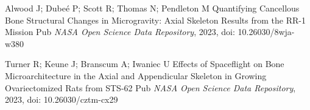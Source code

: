 \documentclass{article}
\begin{document}
\begin{thebibliography}{1}
\bibitem{}
Alwood J; Dubeé P; Scott R; Thomas N; Pendleton M
\newblock Quantifying Cancellous Bone Structural Changes in Microgravity: Axial Skeleton Results from the RR-1 Mission
\newblock Pub {\em NASA Open Science Data Repository}, 2023, doi: 10.26030/8wja-w380

\bibitem{}
Turner R; Keune J; Branscum A; Iwaniec U
\newblock Effects of Spaceflight on Bone Microarchitecture in the Axial and Appendicular Skeleton in Growing Ovariectomized Rats from STS-62
\newblock Pub {\em NASA Open Science Data Repository}, 2023, doi: 10.26030/cztm-cx29


\end{thebibliography}
\end{document}

